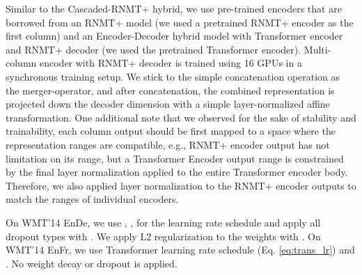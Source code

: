 \documentclass[11pt,a4paper]{article}
\begin{document}
Similar to the Cascaded-RNMT+ hybrid, we use pre-trained encoders that
are borrowed from an RNMT+ model (we used a pretrained RNMT+ encoder as
the first column) and an Encoder-Decoder hybrid model with Transformer
encoder and RNMT+ decoder (we used the pretrained Transformer
encoder). Multi-column encoder with RNMT+ decoder is trained using 16
GPUs in a synchronous training setup. We stick to the simple
concatenation operation as the merger-operator, and after
concatenation, the combined representation is projected down the
decoder dimension with a simple layer-normalized affine
transformation. One additional note that we observed for the sake of
stability and trainability, each column output should be first mapped
to a space where the representation ranges are compatible, e.g., RNMT+
encoder output has not limitation on its range, but a Transformer
Encoder output range is constrained by the final layer normalization
applied to the entire Transformer encoder body. Therefore, we also
applied layer normalization to the RNMT+ encoder outputs to match the
ranges of individual encoders.

On WMT'14 EnDe, we use , ,  for
the learning rate schedule and apply all dropout types with
.  We apply L2 regularization to the weights with
. On WMT'14 EnFr, we use Transformer
learning rate schedule (Eq. \ref{eq:trans_lr})  and .
No weight decay or dropout is applied.
\end{document}
